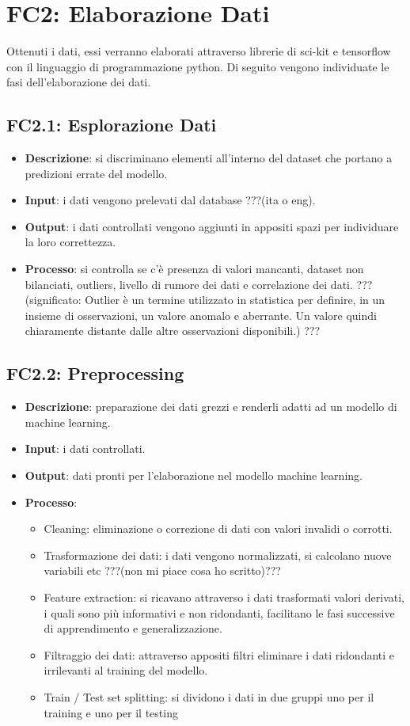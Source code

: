 \section{FC2: Elaborazione Dati}
Ottenuti i dati, essi verranno elaborati attraverso librerie di sci-kit e tensorflow con il linguaggio di programmazione python.
Di seguito vengono individuate le fasi dell'elaborazione dei dati.
\subsection{FC2.1: Esplorazione Dati}
\begin{itemize}
	\item \textbf{Descrizione}: si discriminano elementi all'interno del dataset che portano a predizioni errate del modello.
	\item \textbf{Input}: i dati vengono prelevati dal database ???(ita o eng).
	\item \textbf{Output}: i dati controllati vengono aggiunti in appositi spazi per individuare la loro correttezza.
	\item \textbf{Processo}: si controlla se c'è presenza di valori mancanti, dataset non bilanciati, outliers, livello di rumore dei dati e correlazione dei dati. ???(significato: Outlier è un termine utilizzato in statistica per definire, in un insieme di osservazioni, un valore anomalo e aberrante. Un valore quindi chiaramente distante dalle altre osservazioni disponibili.) ???
\end{itemize}
\subsection{FC2.2: Preprocessing}
\begin{itemize}
	\item \textbf{Descrizione}: preparazione dei dati grezzi e renderli adatti ad un modello di machine learning. 
	\item \textbf{Input}: i dati controllati.
	\item \textbf{Output}: dati pronti per l'elaborazione nel modello machine learning.
	\item \textbf{Processo}: \begin{itemize}[leftmargin = 2cm]
		\item Cleaning: eliminazione o correzione di dati con valori invalidi o corrotti.
		\item Trasformazione dei dati: i dati vengono normalizzati, si calcolano nuove variabili etc ???(non mi piace cosa ho scritto)??? 
		\item Feature extraction: si ricavano attraverso i dati trasformati valori derivati, i quali sono più informativi e non ridondanti, facilitano le fasi successive di apprendimento e generalizzazione.
		\item Filtraggio dei dati: attraverso appositi filtri eliminare i dati ridondanti e irrilevanti al training del modello.
		\item Train / Test set splitting: si dividono i dati in due gruppi uno per il training e uno per il testing
	\end{itemize}
\end{itemize}
